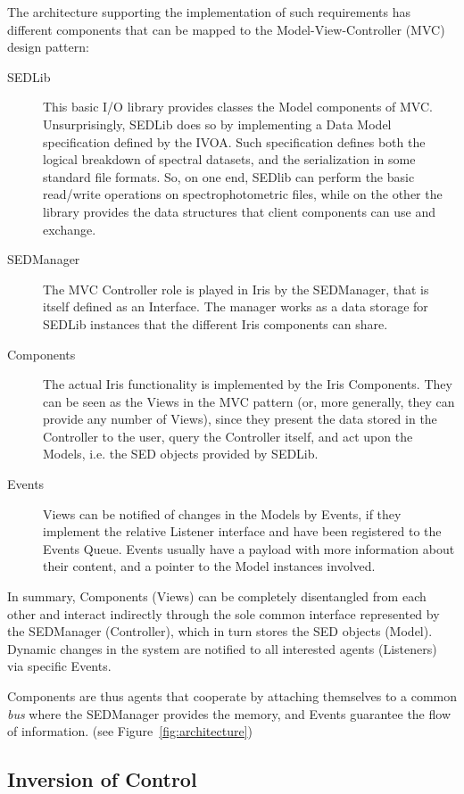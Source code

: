 \documentclass[final,5p,authoryear]{elsarticle}
\begin{document}
The architecture supporting the implementation of such requirements has
different components that can be mapped to the Model-View-Controller (MVC)
design pattern:
\begin{description}
\item[SEDLib] This basic I/O library provides
classes the Model components of MVC. Unsurprisingly, SEDLib does so by
implementing a Data Model specification defined by the IVOA. Such specification
defines both the logical breakdown of spectral datasets, and the serialization
in some standard file formats. So, on one end, SEDlib can perform the basic
read/write operations on spectrophotometric files, while on the other the library
provides the data structures that client components can use and exchange.
\item[SEDManager] The MVC Controller role is played in Iris by the SEDManager,
that is itself defined as an Interface. The manager works as a data storage for
SEDLib instances that the different Iris components can share.
\item[Components] The actual Iris functionality is implemented by the Iris
Components. They can be seen as the Views in the MVC pattern (or, more
generally, they can provide any number of Views), since they present the data
stored in the Controller to the user, query the Controller itself, and act upon
the Models, i.e. the SED objects provided by SEDLib. 
\item[Events] Views can be
notified of changes in the Models by Events, if they implement the relative
Listener interface and have been registered to the Events Queue. Events usually
have a payload with more information about their content, and a pointer to the
Model instances involved. 
\end{description}

In summary, Components (Views) can be completely disentangled from each other
and interact indirectly through the sole common interface represented by the
SEDManager (Controller), which in turn stores the SED objects (Model). Dynamic
changes in the system are notified to all interested agents (Listeners) via
specific Events.

Components are thus agents that cooperate by attaching themselves to a common
\emph{bus} where the SEDManager provides the memory, and Events guarantee the
flow of information. (see Figure~\ref{fig:architecture})

\subsection{Inversion of Control}
\end{document}
